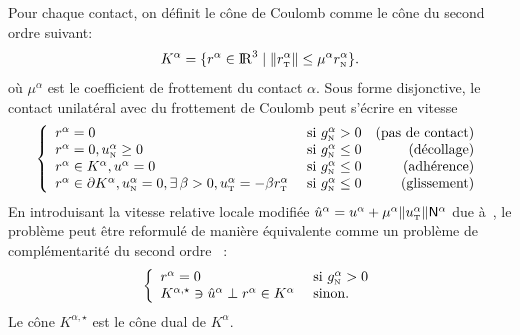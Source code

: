 \documentclass{CSMA2017}
\def\RR{\nbR}
\def\nbR{\ensuremath{\mathrm{I\!R}}} %
\def\n{{\hbox{\tiny{N}}}}
\def\t{{\hbox{\tiny{T}}}}
\begin{document}
Pour chaque contact, on définit le cône de Coulomb comme le cône du second ordre suivant:
\begin{equation}
  \label{eq:CoulombCone}
  K^\alpha = \{r^\alpha \in \RR^3 \mid \|r^\alpha_\t\| \leq \mu^\alpha r^\alpha_\n\}.
\end{equation}
où $\mu^\alpha$ est le coefficient de frottement du contact $\alpha$. Sous forme disjonctive, le contact unilatéral avec du frottement de Coulomb peut s'écrire en vitesse
\begin{equation}
  \label{eq:contact-disjunctive}
  \left\{\begin{array}{llr}
      r^\alpha = 0  &\text{ si } g^\alpha_{\n} > 0  & \text{(pas de  contact)}\\
      r^\alpha = 0,  u^\alpha_\n \geq 0   &\text{ si } g^\alpha_{\n} \leq 0 & \text{(décollage)} \\
      r^\alpha \in K^\alpha, u^\alpha =0 &\text{ si } g^\alpha_{\n} \leq 0 & \text{(adhérence)}  \\
      r^\alpha \in \partial K^\alpha,u^\alpha _\n=0,  \exists\,\beta > 0, u^\alpha_\t = -\beta r^\alpha_\t &\text{ si } g^\alpha_{\n} \leq 0 & \text{(glissement)}  \\
    \end{array}\right.
\end{equation}
En introduisant la vitesse relative locale modifiée $\hat u^\alpha = u^\alpha + \mu^\alpha \|u^\alpha_\t\| {\sf N}^\alpha$ due à~\cite{DeSaxce92}, le problème peut être reformulé de manière équivalente comme un problème de complémentarité du second ordre~\cite{DeSaxce92,Acary.ea_ZAMM2011} :
\begin{equation}
  \label{eq:contact-soccp}
  \left\{\begin{array}{ll}
      r^\alpha = 0  & \text{ si } g^\alpha_{\n} > 0  \\
      K^{\alpha,\star}\ni \hat u^\alpha \perp r^\alpha \in K^\alpha  & \text{ sinon. }\\
    \end{array}\right.
\end{equation}
Le cône $K^{\alpha,\star}$ est le cône dual de $K^\alpha$.
\end{document}
